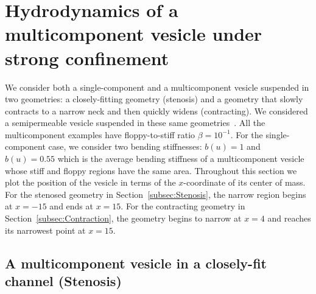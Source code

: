 \documentclass[twoside,twocolumn,9pt]{article}
\begin{document}
\section{\label{sec:results}Hydrodynamics of a multicomponent vesicle
under strong confinement}
We consider both a single-component and a multicomponent vesicle
suspended in two geometries: a closely-fitting geometry (stenosis) and a
geometry that slowly contracts to a narrow neck and then quickly widens
(contracting). We considered a semipermeable vesicle suspended in these
same geometries~\cite{qua-gan-you2021}. All the multicomponent examples
have floppy-to-stiff ratio $\beta = 10^{-1}$. For the single-component
case, we consider two bending stiffnesses: $b(u) = 1$ and $b(u) = 0.55$
which is the average bending stiffness of a multicomponent vesicle whose
stiff and floppy regions have the same area. Throughout this section we
plot the position of the vesicle in terms of the $x$-coordinate of its
center of mass. For the stenosed geometry in
Section~\ref{subsec:Stenosis}, the narrow region begins at $x=-15$ and
ends at $x=15$. For the contracting geometry in
Section~\ref{subsec:Contraction}, the geometry begins to narrow at $x=4$
and reaches its narrowest point at $x=15$.





\subsection{\label{subsec:Stenosis}A multicomponent vesicle in a closely-fit channel (Stenosis)}
\end{document}
